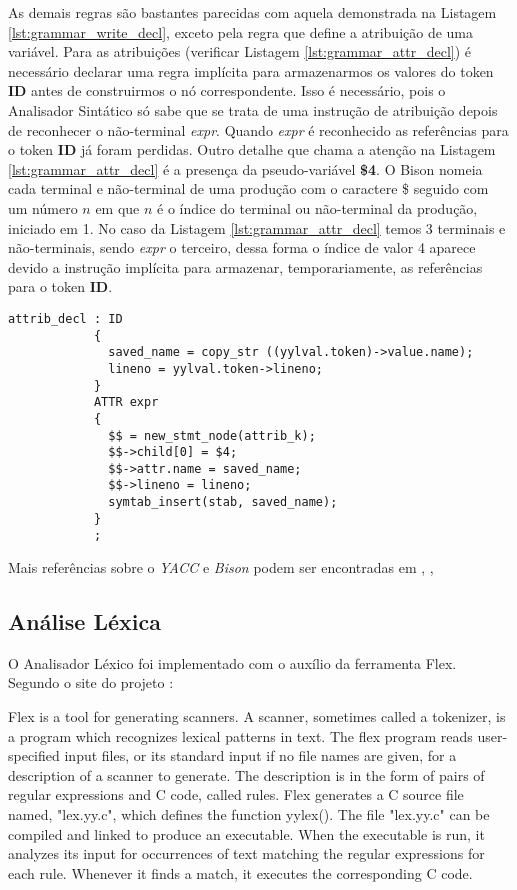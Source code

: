 As demais regras são bastantes parecidas com aquela demonstrada na Listagem
\ref{lst:grammar_write_decl}, exceto pela regra que define a atribuição de uma
variável. Para as atribuições (verificar Listagem \ref{lst:grammar_attr_decl})
é necessário declarar uma regra implícita para armazenarmos os valores do token
\textbf{ID} antes de construirmos o nó correspondente. Isso é necessário, pois
o Analisador Sintático só sabe que se trata de uma instrução de atribuição
depois de reconhecer o não-terminal \emph{expr}. Quando \emph{expr} é
reconhecido as referências para o token \textbf{ID} já foram perdidas. Outro
detalhe que chama a atenção na Listagem \ref{lst:grammar_attr_decl} é a
presença da pseudo-variável \textbf{\$4}. O Bison nomeia cada terminal e
não-terminal de uma produção com o caractere \$ seguido com um número $n$ em
que $n$ é o índice do terminal ou não-terminal da produção, iniciado em 1. No
caso da Listagem \ref{lst:grammar_attr_decl} temos 3 terminais e
não-terminais, sendo \emph{expr} o terceiro, dessa forma o índice de valor 4
aparece devido a instrução implícita para armazenar, temporariamente, as
referências para o token \textbf{ID}.

\begin{lstlisting}[label=lst:grammar_attr_decl,caption=Instrução de Atribuição]
attrib_decl : ID
            {
              saved_name = copy_str ((yylval.token)->value.name);
              lineno = yylval.token->lineno;
            }
            ATTR expr
            {
              $$ = new_stmt_node(attrib_k);
              $$->child[0] = $4;
              $$->attr.name = saved_name;
              $$->lineno = lineno;
              symtab_insert(stab, saved_name);
            }
            ;
\end{lstlisting}

Mais referências sobre o \emph{YACC} e \emph{Bison} podem ser encontradas em
, , 

\subsection{Análise Léxica}
O Analisador Léxico foi implementado com o auxílio da ferramenta Flex. Segundo
o site do projeto \cite{flex-project}:

\begin{citacao}{4cm}{0cm}
  Flex is a tool for generating scanners. A scanner, sometimes called a
  tokenizer, is a program which recognizes lexical patterns in text. The flex
  program reads user-specified input files, or its standard input if no file
  names are given, for a description of a scanner to generate. The description
  is in the form of pairs of regular expressions and C code, called rules. Flex
  generates a C source file named, "lex.yy.c", which defines the function
  yylex(). The file "lex.yy.c" can be compiled and linked to produce an
  executable. When the executable is run, it analyzes its input for occurrences
  of text matching the regular expressions for each rule. Whenever it finds a
  match, it executes the corresponding C code.
\end{citacao}

